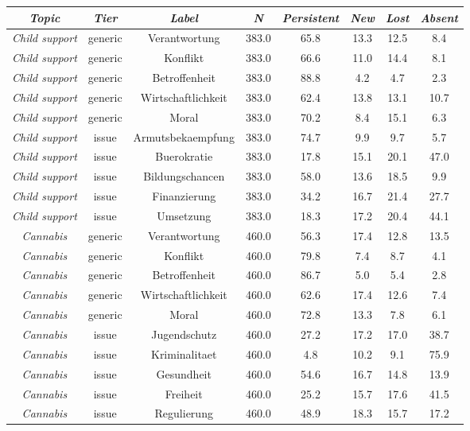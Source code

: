 \begin{tabular}{c c c c c c c c}
      \hline
      \textit{Topic} & \textit{Tier} & \textit{Label} & \textit{N} & \textit{Persistent} & \textit{New} & \textit{Lost} & \textit{Absent} \\
      \hline
      \textit{Child support} & generic & Verantwortung & 383.0 & 65.8 & 13.3 & 12.5 & 8.4 \\
      \textit{Child support} & generic & Konflikt & 383.0 & 66.6 & 11.0 & 14.4 & 8.1 \\
      \textit{Child support} & generic & Betroffenheit & 383.0 & 88.8 & 4.2 & 4.7 & 2.3 \\
      \textit{Child support} & generic & Wirtschaftlichkeit & 383.0 & 62.4 & 13.8 & 13.1 & 10.7 \\
      \textit{Child support} & generic & Moral & 383.0 & 70.2 & 8.4 & 15.1 & 6.3 \\
      \textit{Child support} & issue & Armutsbekaempfung & 383.0 & 74.7 & 9.9 & 9.7 & 5.7 \\
      \textit{Child support} & issue & Buerokratie & 383.0 & 17.8 & 15.1 & 20.1 & 47.0 \\
      \textit{Child support} & issue & Bildungschancen & 383.0 & 58.0 & 13.6 & 18.5 & 9.9 \\
      \textit{Child support} & issue & Finanzierung & 383.0 & 34.2 & 16.7 & 21.4 & 27.7 \\
      \textit{Child support} & issue & Umsetzung & 383.0 & 18.3 & 17.2 & 20.4 & 44.1 \\
      \textit{Cannabis} & generic & Verantwortung & 460.0 & 56.3 & 17.4 & 12.8 & 13.5 \\
      \textit{Cannabis} & generic & Konflikt & 460.0 & 79.8 & 7.4 & 8.7 & 4.1 \\
      \textit{Cannabis} & generic & Betroffenheit & 460.0 & 86.7 & 5.0 & 5.4 & 2.8 \\
      \textit{Cannabis} & generic & Wirtschaftlichkeit & 460.0 & 62.6 & 17.4 & 12.6 & 7.4 \\
      \textit{Cannabis} & generic & Moral & 460.0 & 72.8 & 13.3 & 7.8 & 6.1 \\
      \textit{Cannabis} & issue & Jugendschutz & 460.0 & 27.2 & 17.2 & 17.0 & 38.7 \\
      \textit{Cannabis} & issue & Kriminalitaet & 460.0 & 4.8 & 10.2 & 9.1 & 75.9 \\
      \textit{Cannabis} & issue & Gesundheit & 460.0 & 54.6 & 16.7 & 14.8 & 13.9 \\
      \textit{Cannabis} & issue & Freiheit & 460.0 & 25.2 & 15.7 & 17.6 & 41.5 \\
      \textit{Cannabis} & issue & Regulierung & 460.0 & 48.9 & 18.3 & 15.7 & 17.2 \\
      \hline
    \end{tabular}